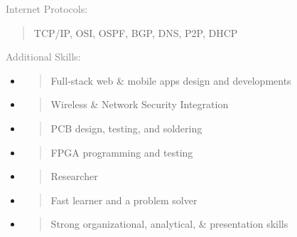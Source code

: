 \documentclass[letterpage]{article}
\begin{document}
\begin{minipage}[t]{0.424\linewidth}
  \vspace{7px}
  \textcolor{gray}{Internet Protocols:}  \\
  \begin{quote}
      \textmd{TCP/IP, OSI, OSPF, BGP, DNS, P2P, DHCP}\\
  \end{quote}

  \vspace{7px}
  \textcolor{gray}{Additional Skills:}  \\
  \begin{itemize}[leftmargin=*,labelindent=0mm,labelsep=0mm]
    \raggedright
  \item
    \begin{quote}
        \textmd{Full-stack web \& mobile apps design and developments}
    \end{quote}
  \item
    \begin{quote}      
        \textmd{Wireless \&  Network Security Integration}
    \end{quote}
  \item
    \begin{quote}
        \textmd{PCB design, testing, and soldering}
    \end{quote}
  \item
    \begin{quote}
        \textmd{FPGA programming and testing}
    \end{quote}
  \item
    \begin{quote}
        \textsf{Researcher}
    \end{quote}
  \item
    \begin{quote}
        \textmd{Fast learner and a problem solver}
    \end{quote}
  \item
    \begin{quote}
        \textmd{Strong organizational, analytical, \& presentation skills}
    \end{quote}
  \end{itemize}
\end{minipage}
\end{document}
